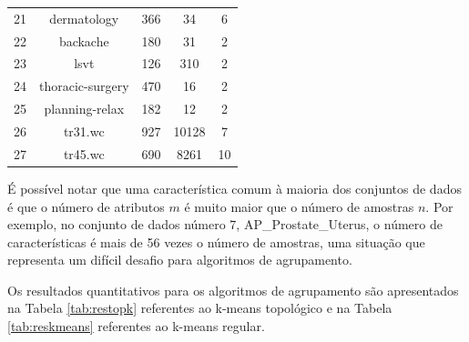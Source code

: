 \documentclass[sn-mathphys,Numbered]{sn-jnl}%
\theoremstyle{thmstyleone}%
\theoremstyle{thmstyletwo}%
\theoremstyle{thmstylethree}%
\begin{document}
\begin{table}[htb]
\begin{tabular}{ccccc}
21 & dermatology                       & 366   & 34      & 6  \\
22 & backache                          & 180   & 31      & 2  \\
23 & lsvt                              & 126   & 310     & 2  \\
24 & thoracic-surgery                  & 470   & 16      & 2  \\
25 & planning-relax                    & 182   & 12      & 2  \\
26 & tr31.wc                           & 927   & 10128   & 7  \\
27 & tr45.wc                           & 690   & 8261    & 10 \\
\bottomrule  
\end{tabular}
\label{tab:data}
\end{table}

É possível notar que uma característica comum à maioria dos conjuntos de dados é que o número de atributos $m$ é muito maior que o número de amostras $n$. Por exemplo, no conjunto de dados número 7, AP\_Prostate\_Uterus, o número de características é mais de 56 vezes o número de amostras, uma situação que representa um difícil desafio para algoritmos de agrupamento. %


Os resultados quantitativos para os algoritmos de agrupamento são apresentados na Tabela \ref{tab:restopk} referentes ao k-means topológico e na Tabela \ref{tab:reskmeans} referentes ao k-means regular.
\end{document}
